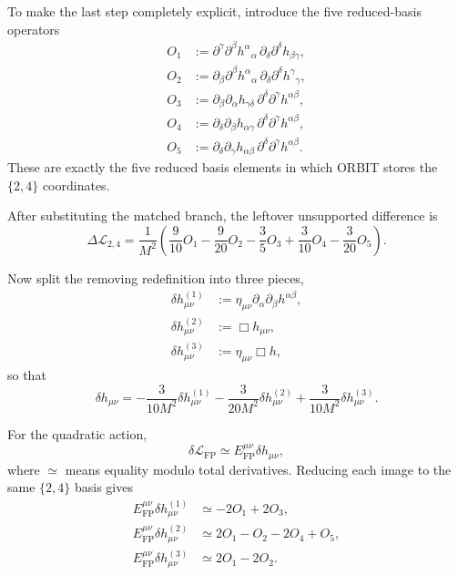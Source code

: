\documentclass[11pt]{article}
\begin{document}
To make the last step completely explicit, introduce the five reduced-basis operators
\begin{align}
O_1 &:= \partial^\gamma\partial^\beta h^\alpha{}_\alpha\,
\partial_\delta\partial^\delta h_{\beta\gamma},\\
O_2 &:= \partial_\beta\partial^\beta h^\alpha{}_\alpha\,
\partial_\delta\partial^\delta h^\gamma{}_\gamma,\\
O_3 &:= \partial_\beta\partial_\alpha h_{\gamma\delta}\,
\partial^\delta\partial^\gamma h^{\alpha\beta},\\
O_4 &:= \partial_\delta\partial_\beta h_{\alpha\gamma}\,
\partial^\delta\partial^\gamma h^{\alpha\beta},\\
O_5 &:= \partial_\delta\partial_\gamma h_{\alpha\beta}\,
\partial^\delta\partial^\gamma h^{\alpha\beta}.
\end{align}
These are exactly the five reduced basis elements in which ORBIT stores the $\{2,4\}$ coordinates.

After substituting the matched branch, the leftover unsupported difference is
\begin{equation}
\Delta\mathcal L_{2,4}
=
\frac{1}{M^2}\left(
\frac{9}{10}O_1
-\frac{9}{20}O_2
-\frac35 O_3
+\frac{3}{10}O_4
-\frac{3}{20}O_5
\right).
\end{equation}

Now split the removing redefinition into three pieces,
\begin{align}
\delta h_{\mu\nu}^{(1)} &:= \eta_{\mu\nu}\partial_\alpha\partial_\beta h^{\alpha\beta},\\
\delta h_{\mu\nu}^{(2)} &:= \Box h_{\mu\nu},\\
\delta h_{\mu\nu}^{(3)} &:= \eta_{\mu\nu}\Box h,
\end{align}
so that
\[
\delta h_{\mu\nu}
=
-\frac{3}{10M^2}\delta h_{\mu\nu}^{(1)}
-\frac{3}{20M^2}\delta h_{\mu\nu}^{(2)}
+\frac{3}{10M^2}\delta h_{\mu\nu}^{(3)}.
\]

For the quadratic action,
\[
\delta\mathcal L_{\mathrm{FP}}
\simeq
E_{\mathrm{FP}}^{\mu\nu}\delta h_{\mu\nu},
\]
where $\simeq$ means equality modulo total derivatives. Reducing each image to the same $\{2,4\}$ basis gives
\begin{align}
E_{\mathrm{FP}}^{\mu\nu}\delta h_{\mu\nu}^{(1)}
&\simeq
-2O_1+2O_3,\\
E_{\mathrm{FP}}^{\mu\nu}\delta h_{\mu\nu}^{(2)}
&\simeq
2O_1-O_2-2O_4+O_5,\\
E_{\mathrm{FP}}^{\mu\nu}\delta h_{\mu\nu}^{(3)}
&\simeq
2O_1-2O_2.
\end{align}
\end{document}
